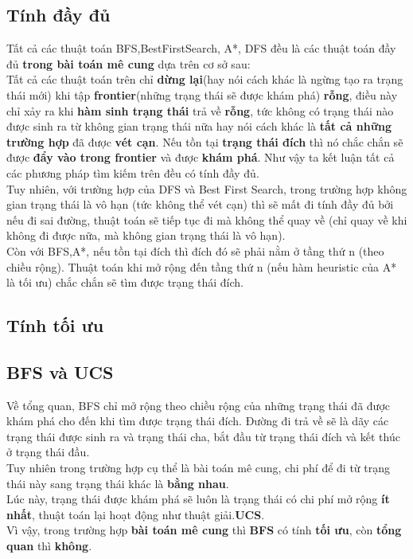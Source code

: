 \documentclass[11pt]{article} %
\begin{document}
\subsection{Tính đầy đủ}
Tất cả các thuật toán BFS,BestFirstSearch, A*, DFS đều là các thuật toán đầy đủ \textbf{trong bài toán mê cung} dựa trên cơ sở sau:\\
	Tất cả các thuật toán trên chỉ \textbf{dừng lại}(hay nói cách khác là ngừng tạo ra trạng thái mới) khi tập \textbf{frontier}(những trạng thái sẽ được khám phá) \textbf{rỗng}, điều này chỉ xảy ra khi \textbf{hàm sinh trạng thái} trả về \textbf{rỗng}, tức không có trạng thái nào được sinh ra từ không gian trạng thái nữa hay nói cách khác là \textbf{tất cả những trường hợp} đã được \textbf{vét cạn}. Nếu tồn tại \textbf{trạng thái đích} thì nó chắc chắn sẽ được \textbf{đẩy vào trong frontier} và được \textbf{khám phá}. Như vậy ta kết luận tất cả các phương pháp tìm kiếm trên đều có tính đầy đủ.\\
Tuy nhiên, với trường hợp của DFS và Best First Search, trong trường hợp không gian trạng thái là vô hạn (tức không thể vét cạn) thì sẽ mất đi tính đầy đủ bởi nếu đi sai đường, thuật toán sẽ tiếp tục đi mà không thể quay về (chỉ quay về khi không đi được nữa, mà không gian trạng thái là vô hạn).\\
Còn với BFS,A*, nếu tồn tại đích thì đích đó sẽ phải nằm ở tầng thứ n (theo chiều rộng). Thuật toán khi mở rộng đến tầng thứ n (nếu hàm heuristic của A* là tối ưu) chắc chắn sẽ tìm được trạng thái đích.\\
\subsection{Tính tối ưu}
\subsection{BFS và UCS}
Về tổng quan, BFS chỉ mở rộng theo chiều rộng của những trạng thái đã được khám phá cho đến khi tìm được trạng thái đích. Đường đi trả về sẽ là dãy các trạng thái được sinh ra và trạng thái cha, bắt đầu từ trạng thái đích và kết thúc ở trạng thái đầu.\\
Tuy nhiên trong trường hợp cụ thể là bài toán mê cung, chi phí để đi từ trạng thái này sang trạng thái khác là \textbf{bằng nhau}.\\
Lúc này, trạng thái được khám phá sẽ luôn là trạng thái có chi phí mở rộng \textbf{ít nhất}, thuật toán lại hoạt động như thuật giải.\textbf{UCS}.\\
Vì vậy, trong trường hợp \textbf{bài toán mê cung} thì \textbf{BFS} có tính \textbf{tối ưu}, còn \textbf{tổng quan} thì \textbf{không}.
\end{document}
